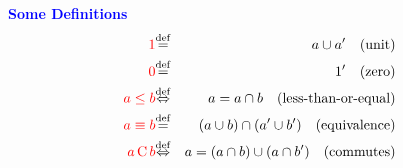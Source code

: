 \documentclass{slides}
\begin{document}
\begin{slide}

\textcolor{blue}{\textbf{Some Definitions}}
\begin{eqnarray}
\textcolor{red}{1} &
{\buildrel\rm def\over =}& a\cup a' \quad\mbox{(unit)}\\
\textcolor{red}{0} &
{\buildrel\rm def\over =}& 1' \quad\mbox{(zero)}\\
\textcolor{red}{a\le b} &
{\buildrel\rm def\over \Leftrightarrow}& a=a\cap b
 \quad\mbox{(less-than-or-equal)} \\
\textcolor{red}{a\equiv b} &{\buildrel\rm def\over =}&
(a\cup b)\cap(a'\cup b')  \quad\mbox{(equivalence)} \\
\textcolor{red}{a \,{\rm C}\, b} &
{\buildrel\rm def\over \Leftrightarrow}& a=(a\cap b)
 \cup(a\cap b')
 \quad\mbox{(commutes)}
\end{eqnarray}

\end{slide}
\end{document}
